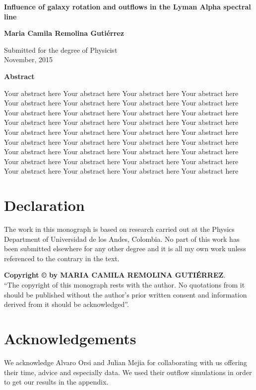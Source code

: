 \newpage
\thispagestyle{empty}
\begin{center}
  \textbf{\Large Influence of galaxy rotation and outflows in the Lyman Alpha spectral line}

  \vspace*{1cm}
  \textbf{\large Maria Camila Remolina Guti\'errez}

  \vspace*{0.5cm}
  {\large Submitted for the degree of Physicist\\ November, 2015}

  \vspace*{1cm}
  \textbf{\large Abstract}
\end{center}
Your abstract here Your abstract here Your abstract here Your abstract here
Your abstract here Your abstract here Your abstract here Your abstract here
Your abstract here Your abstract here Your abstract here Your abstract here
Your abstract here Your abstract here Your abstract here Your abstract here
Your abstract here Your abstract here Your abstract here Your abstract here
Your abstract here Your abstract here Your abstract here Your abstract here
Your abstract here Your abstract here Your abstract here Your abstract here
Your abstract here Your abstract here Your abstract here Your abstract here
Your abstract here Your abstract here Your abstract here Your abstract here

\chapter*{Declaration}
The work in this monograph is based on research carried out at the Physics Department of Universidad de los Andes, Colombia. No part of this work has been submitted elsewhere for any other degree and it is all my own work unless referenced to the contrary in the text. 

\vspace{4in}
\noindent \textbf{Copyright \copyright{} by MARIA CAMILA REMOLINA GUTI\'ERREZ}.\\
``The copyright of this monograph rests with the author.  No quotations
from it should be published without the author's prior written consent
and information derived from it should be acknowledged''.

\chapter*{Acknowledgements}
We acknowledge Alvaro Orsi and Julian Mejia for collaborating with us offering their time, advice and especially data. We used their outflow simulations in order to get our results in the appendix.\\

